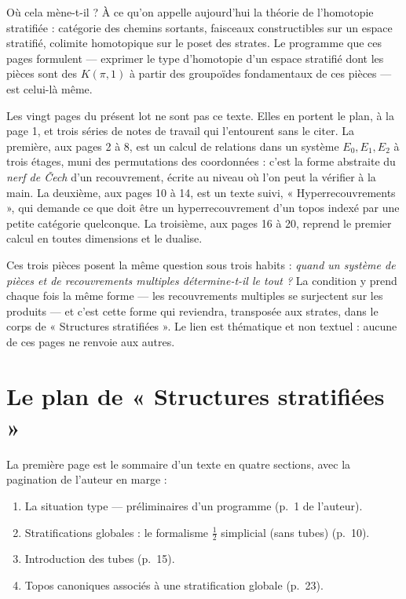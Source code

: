 \documentclass[11pt,a4paper]{article}
\begin{document}
\begin{resume}
Où cela mène-t-il ? À ce qu'on appelle aujourd'hui la théorie de l'homotopie
stratifiée : catégorie des chemins sortants, faisceaux constructibles sur un
espace stratifié, colimite homotopique sur le poset des strates. Le programme
que ces pages formulent — exprimer le type d'homotopie d'un espace stratifié
dont les pièces sont des $K(\pi,1)$ à partir des groupoïdes fondamentaux de ces
pièces — est celui-là même.

Les vingt pages du présent lot ne sont pas ce texte. Elles en portent le plan,
à la page 1, et trois séries de notes de travail qui l'entourent sans le citer.
La première, aux pages 2 à 8, est un calcul de relations dans un système
$E_{0}, E_{1}, E_{2}$ à trois étages, muni des permutations des coordonnées :
c'est la forme abstraite du \emph{nerf de Čech} d'un recouvrement, écrite au
niveau où l'on peut la vérifier à la main. La deuxième, aux pages 10 à 14, est
un texte suivi, « Hyperrecouvrements », qui demande ce que doit être un
hyperrecouvrement d'un topos indexé par une petite catégorie quelconque. La
troisième, aux pages 16 à 20, reprend le premier calcul en toutes dimensions et
le dualise.

Ces trois pièces posent la même question sous trois habits : \emph{quand un
système de pièces et de recouvrements multiples détermine-t-il le tout ?} La
condition y prend chaque fois la même forme — les recouvrements multiples se
surjectent sur les produits — et c'est cette forme qui reviendra, transposée aux
strates, dans le corps de « Structures stratifiées ». Le lien est thématique et
non textuel : aucune de ces pages ne renvoie aux autres.

\end{resume}

\section*{Le plan de « Structures stratifiées »}

La première page est le sommaire d'un texte en quatre sections, avec la
pagination de l'auteur en marge :

\begin{enumerate}
  \item La situation type — préliminaires d'un programme (p.~1 de l'auteur).
  \item Stratifications globales : le formalisme $\tfrac{1}{2}$ simplicial
    (sans tubes) (p.~10).
  \item Introduction des tubes (p.~15).
  \item Topos canoniques associés à une stratification globale (p.~23).
\end{enumerate}
\end{document}
